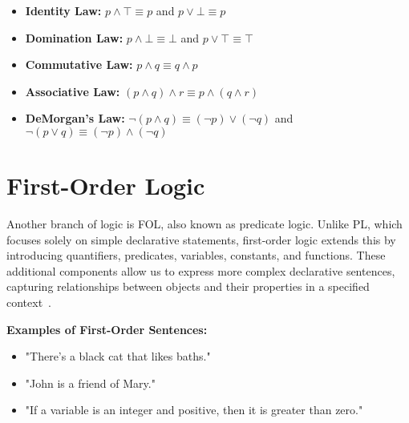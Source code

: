 \begin{itemize}
    \begin{itemize}
        \item \textbf{Identity Law:} \( p \land \top \equiv p \) and \( p \lor \bot \equiv p \)
        \item \textbf{Domination Law:} \( p \land \bot \equiv \bot \) and \( p \lor \top \equiv \top \) 
        \item \textbf{Commutative Law:} \( p \land q \equiv q \land p \)
        \item \textbf{Associative Law:} \( (p \land q) \land r \equiv p \land (q \land r) \)
        \item \textbf{DeMorgan’s Law:} \( \neg (p \land q) \equiv (\neg p) \lor (\neg q) \) and \( \neg (p \lor q) \equiv (\neg p) \land (\neg q) \)
    \end{itemize}
        
\end{itemize}

\section{First-Order Logic}
\label{chap:fol}
Another branch of logic is \gls{FOL}, also known as predicate logic. Unlike \gls{PL}, which focuses solely on simple declarative statements, first-order logic extends this by introducing quantifiers, predicates, variables, constants, and functions. These additional components allow us to express more complex declarative sentences, capturing relationships between objects and their properties in a specified context~\cite{huth_2004_logic, gouveia_lgica}.

\textbf{Examples of First-Order Sentences:}
\begin{itemize}  
    \item "There's a black cat that likes baths." 
    \item "John is a friend of Mary." 
    \item "If a variable is an integer and positive, then it is greater than zero." 
\end{itemize}  

